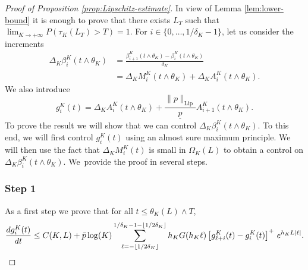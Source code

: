 \documentclass[10pt]{amsart}
\theoremstyle{plain}
\theoremstyle{remark}
\begin{document}
\begin{proof}[Proof of Proposition \ref{prop:Lipschitz-estimate}]
In view of Lemma \ref{lem:lower-bound} it is enough to prove that there exists $L_T$ such that
$\lim_{K\to +\infty} P(\tau_K(L_T)>T)=1$. For $i\in\{0,\ldots,1/\delta_K-1\}$, let us consider the increments\vspace*{-3pt}\enlargethispage{\baselineskip}
\begin{align*}
\Delta_K\beta^K_{i}(t\wedge \theta_K)&= \frac{\beta_{i+1}^K(t\wedge \theta_K)-\beta_{i}^K(t\wedge \theta_K)}{\delta_K}\\
&= \Delta_KM^K_{i}(t\wedge \theta_K) + \Delta_KA^K_{i}(t\wedge \theta_K).
\end{align*}
We also introduce\vspace*{-3pt}
\begin{equation}
\label{def:g}
g^K_{i}(t)=\Delta_K A^K_{i}(t\wedge \theta_K)+\frac{\|p\|_{\text{Lip}}}{\underline p} A^K_{i+1}(t\wedge\theta_K).
\end{equation}
To prove the result we will show that we can control $\Delta_K\beta^K_{i}(t\wedge \theta_K)$. To this end, we will first control $g_i^K(t)$ using an almost sure maximum principle. We will then use the fact that $\Delta_K M^K_{i}(t)$ is small in $\Omega_K(L)$ to obtain a control on $\Delta_K\beta^K_{i}(t\wedge \theta_K)$. We~provide the proof in several steps.

\subsubsection*{Step 1} As a first step we prove that for all $t\leq\theta_K(L)\wedge T$,\vspace*{-3pt}
\[
{d g^K_{i}(t)\over dt} \le C(K,L)
+ \bar p \log(K)\sum_{\ell=-\lfloor 1/2\delta_K\rfloor}^{1/\delta_K-1-\lfloor 1/2\delta_K\rfloor}
h_{K} G(h_{K}\ell) \left[g^K_{\ell+i}(t) - g^K_{i}(t)\right]^+ \, e^{h_{K}L|\ell|}.
\]


\end{proof}
\end{document}
